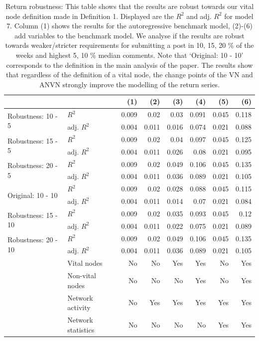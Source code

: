 \begin{table}[ht]
\centering
\caption{Return robustness: This table shows that the results are robust towards our vital node definition made in 
                    Definition 1. Displayed are the $R^2$ and adj. $R^2$ for model 7. Column (1) shows the results for the autoregressive benchmark model, (2)-(6) add variables to the benchmark model. 
                    We analyse if the results are robust towards weaker/stricter requirements for submitting a post 
                    in {10, 15, 20} \% of the weeks and highest {5, 10} \% median comments. Note that `Original: 10 - 10' corresponds to the 
                    definition in the main analysis of the paper. The results show that regardless of the definition of 
                    a vital node, the change points of the VN and ANVN strongly improve the modelling of the return series.} 
\label{table_r2_return_robust}
\begingroup\scriptsize
\begin{tabular}{ll|rrrrrr}
  \hline
\hline
  &   & (1) & (2) & (3) & (4) & (5) & (6) \\ 
  \hline
\multirow{2}{*}{Robustness: 10 - 5} & $R^2$ & 0.009 & 0.02 & 0.03 & 0.091 & 0.045 & 0.118 \\ 
    & adj. $R^2$ & 0.004 & 0.011 & 0.016 & 0.074 & 0.021 & 0.088 \\ 
   \hline
\multirow{2}{*}{Robustness: 15 - 5} & $R^2$ & 0.009 & 0.02 & 0.04 & 0.097 & 0.045 & 0.125 \\ 
    & adj. $R^2$ & 0.004 & 0.011 & 0.026 & 0.08 & 0.021 & 0.095 \\ 
   \hline
\multirow{2}{*}{Robustness: 20 - 5} & $R^2$ & 0.009 & 0.02 & 0.049 & 0.106 & 0.045 & 0.135 \\ 
    & adj. $R^2$ & 0.004 & 0.011 & 0.036 & 0.089 & 0.021 & 0.105 \\ 
   \hline
\multirow{2}{*}{Original: 10 - 10} & $R^2$ & 0.009 & 0.02 & 0.028 & 0.088 & 0.045 & 0.115 \\ 
    & adj. $R^2$ & 0.004 & 0.011 & 0.014 & 0.07 & 0.021 & 0.084 \\ 
   \hline
\multirow{2}{*}{Robustness: 15 - 10} & $R^2$ & 0.009 & 0.02 & 0.035 & 0.093 & 0.045 & 0.12 \\ 
    & adj. $R^2$ & 0.004 & 0.011 & 0.022 & 0.075 & 0.021 & 0.089 \\ 
   \hline
\multirow{2}{*}{Robustness: 20 - 10} & $R^2$ & 0.009 & 0.02 & 0.049 & 0.106 & 0.045 & 0.135 \\ 
    & adj. $R^2$ & 0.004 & 0.011 & 0.036 & 0.089 & 0.021 & 0.105 \\ 
   \hline & Vital nodes & No & No & Yes & Yes & No & Yes \\ & Non-vital nodes & No & No & No & Yes & No & Yes \\ & Network activity & No & Yes & Yes & Yes & Yes & Yes \\ & Network statistics & No & No & No & No & Yes & Yes \\ \hline
\hline
\end{tabular}
\endgroup
\end{table}

